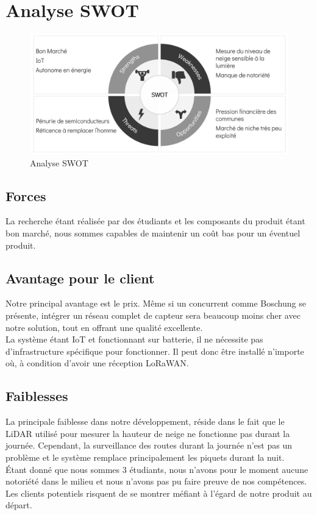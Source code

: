 \section{Analyse SWOT}
\begin{figure}[H]
    \centering
    \includegraphics[width=0.85\linewidth]{Images/business/swot.PNG}
    \caption[]{Analyse SWOT}
    \label{fig:swot}
\end{figure}

\subsection{Forces}
La recherche étant réalisée par des étudiants et les composants du produit étant
bon marché, nous sommes capables de maintenir un coût bas pour un éventuel produit.

\subsection{Avantage pour le client}
Notre principal avantage est le prix. Même si un concurrent comme Boschung se présente,
intégrer un réseau complet de capteur sera beaucoup moins cher avec notre
solution, tout en offrant une qualité excellente.\\
La système étant IoT et fonctionnant sur batterie, il ne nécessite pas d'infrastructure
spécifique pour fonctionner. Il peut donc être installé n'importe où, à condition
d'avoir une réception LoRaWAN.\\

\subsection{Faiblesses}
La principale faiblesse dans notre développement, réside dans le fait que le LiDAR utilisé pour mesurer
la hauteur de neige ne fonctionne pas durant la journée.
Cependant, la surveillance des routes durant la journée n'est pas un problème et le
système remplace principalement les piquets durant la nuit.\\
Étant donné que nous sommes 3 étudiants, nous n'avons pour le moment aucune notoriété dans
le milieu et nous n'avons pas pu faire preuve de nos compétences. Les clients potentiels
risquent de se montrer méfiant à l'égard de notre produit au départ.

